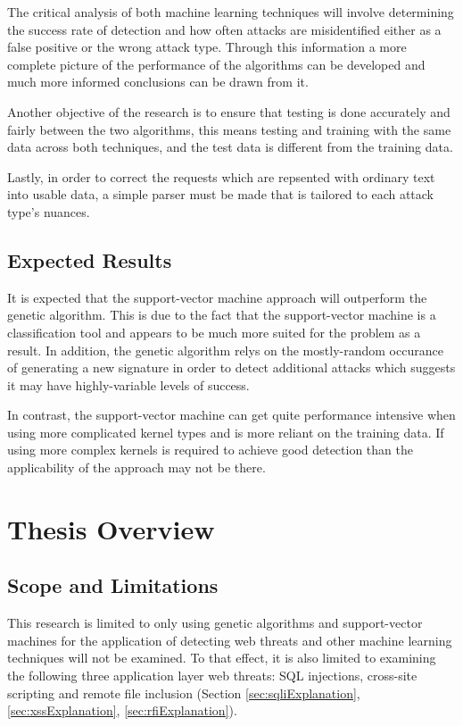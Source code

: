 The critical analysis of both machine learning techniques will involve determining the success rate of detection and how often attacks are misidentified either as a false positive or the wrong attack type.  Through this information a more complete picture of the performance of the algorithms can be developed and much more informed conclusions can be drawn from it.

Another objective of the research is to ensure that testing is done accurately and fairly between the two algorithms, this means testing and training with the same data across both techniques, and the test data is different from the training data.

Lastly, in order to correct the requests which are repsented with ordinary text into usable data, a simple parser must be made that is tailored to each attack type's nuances.

\subsection{Expected Results}\label{sec:expResults}

It is expected that the support-vector machine approach will outperform the genetic algorithm.  This is due to the fact that the support-vector machine is a classification tool and appears to be much more suited for the problem as a result.  In addition, the genetic algorithm relys on the mostly-random occurance of generating a new signature in order to detect additional attacks which suggests it may have highly-variable levels of success.

In contrast, the support-vector machine can get quite performance intensive when using more complicated kernel types and is more reliant on the training data.  If using more complex kernels is required to achieve good detection than the applicability of the approach may not be there.




\section{Thesis Overview}
\subsection{Scope and Limitations}\label{sec:scope}
This research is limited to only using genetic algorithms and support-vector machines for the application of detecting web threats and other machine learning techniques will not be examined.  To that effect, it is also limited to examining the following three application layer web threats: SQL injections, cross-site scripting and remote file inclusion (Section \ref{sec:sqliExplanation}, \ref{sec:xssExplanation}, \ref{sec:rfiExplanation}).  

